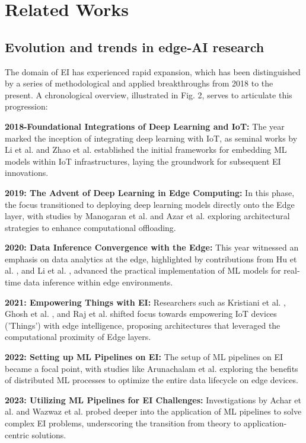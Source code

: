 \documentclass[11pt]{article}
\begin{document}
	\section{Related Works}
	\label{Related Works}
	\subsection{ Evolution and trends in edge‑AI research }
	The domain of EI has experienced rapid expansion, which has been distinguished
	by a series of methodological and applied breakthroughs from 2018 to the present.
	A chronological overview, illustrated in Fig. 2, serves to articulate this progression:
	
	\textbf{2018-Foundational Integrations of Deep Learning and IoT:} The year marked the inception of integrating deep learning with IoT, as seminal works by Li et al. \cite{c25} and Zhao et al. \cite{c26} established the initial frameworks for embedding ML models within IoT infrastructures, laying the groundwork for subsequent EI innovations.
	
	\textbf{2019: The Advent of Deep Learning in Edge Computing:} In this phase, the focus transitioned to deploying deep learning models directly onto the Edge layer, with studies by Manogaran et al. \cite{c27} and Azar et al. \cite{c28} exploring architectural strategies to enhance computational offloading.
	
	\textbf{2020: Data Inference Convergence with the Edge:} This year witnessed an emphasis on data analytics at the edge, highlighted by contributions from Hu et al. \cite{c29}, and Li et al. \cite{c14}, advanced the practical implementation of ML models for real-time data inference within edge environments.
	
	\textbf{2021: Empowering Things with EI:} Researchers such as Kristiani et al. \cite{c31}, Ghosh et al. \cite{c9}, and Raj et al. \cite{c32} shifted focus towards empowering IoT devices ('Things') with edge intelligence, proposing architectures that leveraged the computational proximity of Edge layers.
	
	\textbf{2022: Setting up ML Pipelines on EI:} The setup of ML pipelines on EI became a focal point, with studies like Arunachalam et al. \cite{c33} exploring the benefits of distributed ML processes to optimize the entire data lifecycle on edge devices.
	
	\textbf{2023: Utilizing ML Pipelines for EI Challenges:} Investigations by Achar et al. \cite{c16} and Wazwaz et al. \cite{c17} probed deeper into the application of ML pipelines to solve complex EI problems, underscoring the transition from theory to application-centric solutions.
	
\end{document}
